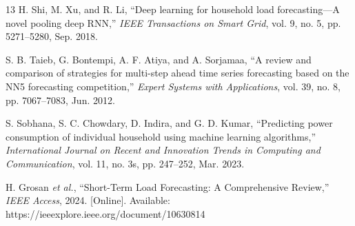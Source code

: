 \documentclass{ieeeaccess}
\begin{document}
\begin{thebibliography}{13}
 H. Shi, M. Xu, and R. Li, ``Deep learning for household load forecasting---A novel pooling deep RNN,'' \emph{IEEE Transactions on Smart Grid}, vol. 9, no. 5, pp. 5271--5280, Sep. 2018.

 S. B. Taieb, G. Bontempi, A. F. Atiya, and A. Sorjamaa, ``A review and comparison of strategies for multi-step ahead time series forecasting based on the NN5 forecasting competition,'' \emph{Expert Systems with Applications}, vol. 39, no. 8, pp. 7067--7083, Jun. 2012.

 S. Sobhana, S. C. Chowdary, D. Indira, and G. D. Kumar, ``Predicting power consumption of individual household using machine learning algorithms,'' \emph{International Journal on Recent and Innovation Trends in Computing and Communication}, vol. 11, no. 3s, pp. 247--252, Mar. 2023.

 H. Grosan \emph{et al.}, ``Short-Term Load Forecasting: A Comprehensive Review,'' \emph{IEEE Access}, 2024. [Online]. Available: https://ieeexplore.ieee.org/document/10630814

\end{thebibliography}
\endgroup
\EOD
\end{document}
